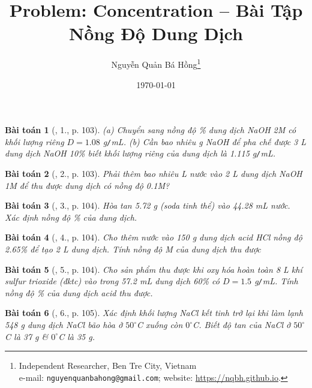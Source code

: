 \documentclass{article}
\title{Problem: Concentration -- Bài Tập Nồng Độ Dung Dịch}
\author{Nguyễn Quản Bá Hồng\footnote{Independent Researcher, Ben Tre City, Vietnam\\e-mail: \texttt{nguyenquanbahong@gmail.com}; website: \url{https://nqbh.github.io}.}}
\date{\today}
\newtheorem{baitoan}{Bài toán}
\begin{document}
\maketitle
\begin{abstract}
	
\end{abstract}
\setcounter{secnumdepth}{4}
\setcounter{tocdepth}{3}
\tableofcontents


\begin{baitoan}[\cite{An_Hoa_Hoc_nang_cao_8_9}, 1., p. 103]
	(a) Chuyển sang nồng độ {\rm\%} dung dịch {\rm NaOH 2M} có khối lượng riêng $D = 1.08$ {\rm g{\tt/}mL}. (b) Cần bao nhiêu {\rm g NaOH} để pha chế được {\rm3 L} dung dịch {\rm NaOH 10\%} biết khối lượng riêng của dung dịch là {\rm1.115 g{\tt/}mL}.
\end{baitoan}

\begin{baitoan}[\cite{An_Hoa_Hoc_nang_cao_8_9}, 2., p. 103]
	Phải thêm bao nhiêu {\rm L} nước vào {2 L} dung dịch {\rm NaOH 1M} để thu được dung dịch có nồng độ {\rm0.1M}?
\end{baitoan}

\begin{baitoan}[\cite{An_Hoa_Hoc_nang_cao_8_9}, 3., p. 104]
	Hòa tan {\rm5.72 g } (soda tinh thể) vào {\rm44.28 mL} nước. Xác định nồng độ {\rm\%} của dung dịch.
\end{baitoan}

\begin{baitoan}[\cite{An_Hoa_Hoc_nang_cao_8_9}, 4., p. 104]
	Cho thêm nước vào {\rm150 g} dung dịch acid {\rm HCl} nồng độ {\rm2.65\%} để tạo {\rm2 L} dung dịch. Tính nồng độ M của dung dịch thu được
\end{baitoan}

\begin{baitoan}[\cite{An_Hoa_Hoc_nang_cao_8_9}, 5., p. 104]
	Cho sản phẩm thu được khi oxy hóa hoàn toàn {\rm8 L} khí sulfur trioxide (đktc) vào trong {\rm57.2 mL} dung dịch {\rm{} 60\%} có $D = 1.5$ {\rm g{\tt/}mL}. Tính nồng độ \% của dung dịch acid thu được.
\end{baitoan}

\begin{baitoan}[\cite{An_Hoa_Hoc_nang_cao_8_9}, 6., p. 105]
	Xác định khối lượng {\rm NaCl} kết tinh trở lại khi làm lạnh {\rm548 g} dung dịch {\rm NaCl} bão hòa ở $50^\circ${\rm C} xuống còn $0^\circ${\rm C}. Biết độ tan của {\rm NaCl} ở $50^\circ${\rm C} là {\rm37 g} \& $0^\circ${\rm C} là {\rm35 g}.
\end{baitoan}
\end{document}
